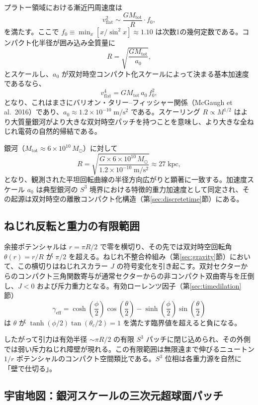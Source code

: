 \documentclass[dvipdfmx,a4paper]{article}
\begin{document}
プラトー領域における漸近円周速度は
\[
v_{\text{flat}}^2 \sim \frac{GM_{\text{tot}}}{R} \cdot f_0,
\]
を満たす。ここで $f_0 \equiv \min_x [x/\sin^2 x] \approx 1.10$ は次数1の幾何定数である。コンパクト化半径が囲み込み全質量に
\[
R = \sqrt{\frac{GM_{\text{tot}}}{a_0}},
\]
とスケールし、$a_0$ が双対時空コンパクト化スケールによって決まる基本加速度であるなら、
\[
v_{\text{flat}}^4 = G M_{\text{tot}} \, a_0 \, f_0^2,
\]
となり、これはまさにバリオン・タリー--フィッシャー関係（McGaugh et al.\ 2016）であり、$a_0 \approx 1.2 \times 10^{-10}\;\mathrm{m/s^2}$ である。スケーリング $R \propto M^{1/2}$ はより大質量銀河がより大きな双対時空パッチを持つことを意味し、より大きな全ねじれ電荷の自然的帰結である。

銀河（$M_{\text{tot}} \approx 6 \times 10^{10}\,M_\odot$）に対して
\[
R = \sqrt{\frac{G \times 6 \times 10^{10}\,M_\odot}{1.2 \times 10^{-10}\;\mathrm{m/s^2}}} \approx 27\;\mathrm{kpc},
\]
となり、観測された平坦回転曲線の半径方向広がりと顕著に一致する。加速度スケール $a_0$ は典型銀河の $S^3$ 境界における特徴的重力加速度として同定され、その起源は双対時空の離散コンパクト化構造（第\ref{sec:discretetime}節）にある。

\subsection{ねじれ反転と重力の有限範囲}

余接ポテンシャルは $r = \pi R/2$ で零を横切り、その先では双対時空回転角 $\theta(r) = r/R$ が $\pi/2$ を超える。ねじれ不整合枠組み（第\ref{sec:gravity}節）において、この横切りはねじれスカラー $J$ の符号変化を引き起こす。双対セクターからのコンパクト三角関数寄与が通常セクターからの非コンパクト双曲寄与を圧倒し、$J < 0$ および斥力重力となる。有効ローレンツ因子（第\ref{sec:timedilation}節）
\[
\gamma_{\text{eff}} = \cosh\!\left(\frac{\phi}{2}\right)\cos\!\left(\frac{\theta}{2}\right) - \sinh\!\left(\frac{\phi}{2}\right)\sin\!\left(\frac{\theta}{2}\right)
\]
は $\theta$ が $\tanh(\phi/2)\tan(\theta_c/2) = 1$ を満たす臨界値を超えると負になる。

したがって引力は有効半径 $\sim \pi R/2$ の有限 $S^3$ パッチに閉じ込められ、その外側では弱い斥力ねじれ障壁が現れる。この有限範囲は無限遠まで伸びるニュートン $1/r$ ポテンシャルのコンパクト空間類比である。$S^3$ 位相は各重力源を自然に「壁で仕切る」。

\subsection{宇宙地図：銀河スケールの三次元超球面パッチ}
\end{document}
